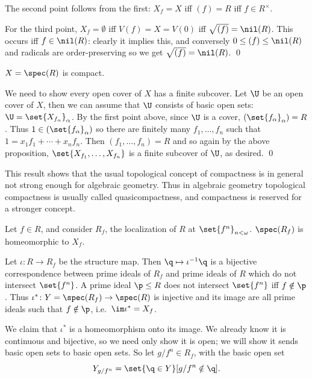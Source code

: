     The second point follows from the first: $X_f=X$ iff $(f)=R$ iff $f\in R^\times$.

    For the third point, $X_f=\emptyset$ iff $V(f)=X=V(0)$ iff $\sqrt{(f)}=\nil(R)$.
    This occurs iff $f\in\nil(R)$: clearly it implies this, and conversely $0\leq(f)\leq\nil(R)$ and radicals are order-preserving so we get $\sqrt{(f)}=\nil(R)$.
    \qed

\eproof

\bcoro

    $X=\spec(R)$ is compact.

\ecoro

\bproof

    We need to show every open cover of $X$ has a finite subcover.
    Let $\U$ be an open cover of $X$, then we can assume that $\U$ consists of basic open sets: $\U=\set{X_{f_\alpha}}_\alpha$.
    By the first point above, since $\U$ is a cover, $(\set{f_\alpha}_\alpha)=R$.
    Thus $1\in(\set{f_\alpha}_\alpha)$ so there are finitely many $f_1,\dots,f_n$ such that $1=x_1f_1+\cdots+x_nf_n$.
    Then $(f_1,\dots,f_n)=R$ and so again by the above proposition, $\set{X_{f_1},\dots,X_{f_n}}$ is a finite subcover of $\U$, as desired.
    \qed

\eproof

\bnote

    This result shows that the usual topological concept of compactness is in general not strong enough for algebraic geometry.
    Thus in algebraic geometry topological compactness is usually called {\emphcolor quasicompactness}, and compactness is reserved for a stronger
    concept.

\enote

\bprop

    Let $f\in R$, and consider $R_f$, the localization of $R$ at $\set{f^n}_{n<\omega}$.
    $\spec(R_f)$ is homeomorphic to $X_f$.

\eprop

\bproof

    Let $\iota\colon R\to R_f$ be the structure map.
    Then $\q\mapsto\iota^{-1}\q$ is a bijective correspondence between prime ideals of $R_f$ and prime ideals of $R$ which do not intersect $\set{f^n}$.
    A prime ideal $\p\leq R$ does not intersect $\set{f^n}$ iff $f\notin\p$.
    Thus $\iota^*\colon Y=\spec(R_f)\to\spec(R)$ is injective and its image are all prime ideals such that $f\notin\p$, i.e.\ $\im\iota^*=X_f$.

    We claim that $\iota^*$ is a homeomorphism onto its image.
    We already know it is continuous and bijective, so we need only show it is open; we will show it sends basic open sets to basic open sets.
    So let $g/f^n\in R_f$, with the basic open set
    $$ Y_{g/f^n} = \set{\q\in Y}[g/f^n\notin\q] . $$

